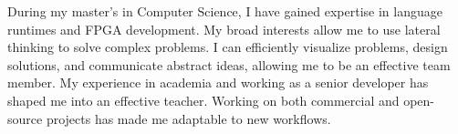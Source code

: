 \documentclass[9.5pt]{developercv} %
\begin{document}
{    \vspace*{-2.0\baselineskip}%



    \begin{multicols}{2}
        
        \vspace*{\baselineskip}

        \RTLpar\sloppy

        During my master's in Computer Science, I have gained expertise in language runtimes and FPGA development.
        My broad interests allow me to use lateral thinking to solve complex problems.
        I can efficiently visualize problems, design solutions, and communicate abstract ideas, allowing me to be an effective team member.
        My experience in academia and working as a senior developer has shaped me into an effective teacher.
        Working on both commercial and open-source projects has made me adaptable to new workflows.

        \vspace*{\fill}
        \columnbreak

        \vspace*{\baselineskip}
        \vspace*{4pt} %

        \justifying \sloppy



        \vspace*{6pt}



        \vspace*{6pt}



        \vspace*{\fill}
    \end{multicols}
    }
\end{document}
